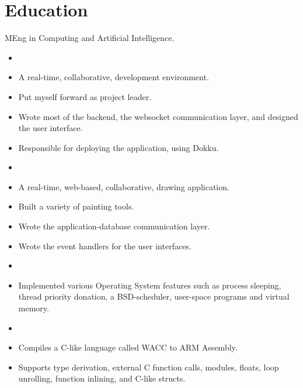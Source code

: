 \documentclass{jcgcv}
\begin{document}
\begin{column}

\section{Education}
MEng in Computing and Artificial Intelligence.

\begin{adjustwidth}{0.3cm}{}

\begin{itemize}
  \item {}
  \item A real-time, collaborative, development environment.
  \item Put myself forward as project leader.
  \item Wrote most of the backend, the websocket communication layer, and designed the user interface.
  \item Responsible for deploying the application, using Dokku.
\end{itemize}

\begin{itemize}
  \item {}
  \item A real-time, web-based, collaborative, drawing application.
  \item Built a variety of painting tools.
  \item Wrote the application-database communication layer.
  \item Wrote the event handlers for the user interfaces.
\end{itemize}

\begin{itemize}
  \item {}
  \item Implemented various Operating System features such as process sleeping, thread priority donation, a BSD-scheduler, user-space programs and virtual memory.
\end{itemize}

\begin{itemize}
  \item {}
  \item Compiles a C-like language called WACC to ARM Assembly.
  \item Supports type derivation, external C function calls, modules, floats, loop unrolling, function inlining, and C-like structs.
\end{itemize}


\end{adjustwidth}
\end{column}
\end{document}
